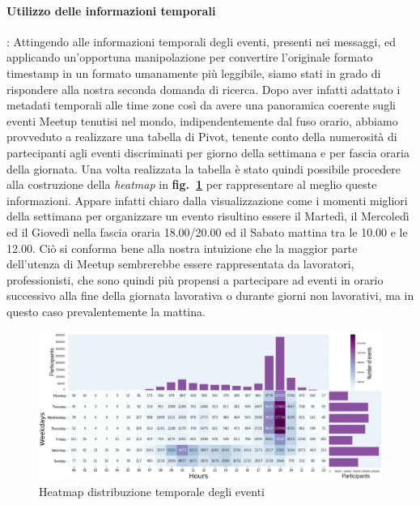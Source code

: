\documentclass[fleqn,10pt]{SelfArx} %
\begin{document}
{\paragraph{Utilizzo delle informazioni temporali}:
Attingendo alle informazioni temporali degli eventi, presenti nei messaggi, ed applicando un'opportuna manipolazione per convertire l'originale formato timestamp in un formato umanamente più leggibile, siamo stati in grado di rispondere alla nostra seconda domanda di ricerca. Dopo aver infatti adattato i metadati temporali alle time zone così da avere una panoramica coerente sugli eventi Meetup tenutisi nel mondo, indipendentemente dal fuso orario, abbiamo provveduto a realizzare una tabella di Pivot, tenente conto della numerosità di partecipanti agli eventi discriminati per giorno della settimana e per fascia oraria della giornata. Una volta realizzata la tabella è stato quindi possibile procedere alla costruzione della \textit{heatmap} in \textbf{fig.~\ref{plot_heatmap}} 
per rappresentare al meglio queste informazioni. Appare infatti chiaro dalla visualizzazione come i momenti migliori della settimana per organizzare un evento risultino essere il Martedì, il Mercoledì ed il Giovedì nella fascia oraria 18.00/20.00 ed il Sabato mattina tra le 10.00 e le 12.00. Ciò si conforma bene alla nostra intuizione che la maggior parte dell'utenza di Meetup sembrerebbe essere rappresentata da lavoratori, professionisti, che sono quindi più propensi a partecipare ad eventi in orario successivo alla fine della giornata lavorativa o durante giorni non lavorativi, ma in questo caso prevalentemente la mattina.
\begin{figure}
\centering
\includegraphics[width = 9.2 cm, height = 5 cm]{heatmap_with_barplot_v3.jpg}
\caption{\label{plot_heatmap} Heatmap distribuzione temporale degli eventi}
\end{figure}
}
\end{document}
